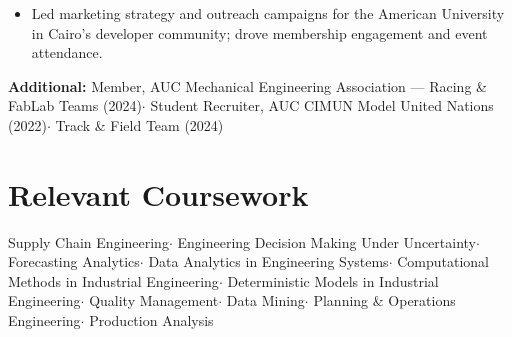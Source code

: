 \documentclass[10pt, letterpaper]{article}
\begin{document}
\entrysep

\begin{itemize}
  \item Led marketing strategy and outreach campaigns for the American University in Cairo's developer community; drove membership engagement and event attendance.
\end{itemize}

\thinsep
{\small\noindent
  \textbf{Additional:}\enspace
  Member, AUC Mechanical Engineering Association --- Racing \& FabLab Teams (2024)\enspace$\cdot$\enspace
  Student Recruiter, AUC CIMUN Model United Nations (2022)\enspace$\cdot$\enspace
  Track \& Field Team (2024)
}

\vspace{1pt}

\section{Relevant Coursework}

{\small\noindent
Supply Chain Engineering\enspace$\cdot$\enspace
Engineering Decision Making Under Uncertainty\enspace$\cdot$\enspace
Forecasting Analytics\enspace$\cdot$\enspace
Data Analytics in Engineering Systems\enspace$\cdot$\enspace
Computational Methods in Industrial Engineering\enspace$\cdot$\enspace
Deterministic Models in Industrial Engineering\enspace$\cdot$\enspace
Quality Management\enspace$\cdot$\enspace
Data Mining\enspace$\cdot$\enspace
Planning \& Operations Engineering\enspace$\cdot$\enspace
Production Analysis
}
\end{document}
